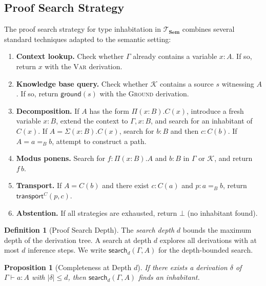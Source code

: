 \documentclass[11pt,a4paper]{article}
\theoremstyle{plain}
\newtheorem{proposition}[theorem]{Proposition}
\theoremstyle{definition}
\newtheorem{definition}[theorem]{Definition}
\theoremstyle{remark}
\newcommand{\Sem}{\mathbf{Sem}}
\newcommand{\transport}{\mathsf{transport}}
\begin{document}
\subsection{Proof Search Strategy}

The proof search strategy for type inhabitation in $\mathcal{T}_{\Sem}$ combines several standard techniques adapted to the semantic setting:

\begin{enumerate}[nosep]
  \item \textbf{Context lookup.} Check whether $\Gamma$ already contains a variable $x : A$.
  If so, return $x$ with the \textsc{Var} derivation.

  \item \textbf{Knowledge base query.} Check whether $\mathcal{K}$ contains a source $s$ witnessing $A$.
  If so, return $\mathsf{ground}(s)$ with the \textsc{Ground} derivation.

  \item \textbf{Decomposition.} If $A$ has the form $\Pi(x:B).C(x)$, introduce a fresh variable $x : B$, extend the context to $\Gamma, x : B$, and search for an inhabitant of $C(x)$.
  If $A = \Sigma(x:B).C(x)$, search for $b : B$ and then $c : C(b)$.
  If $A = a =_B b$, attempt to construct a path.

  \item \textbf{Modus ponens.} Search for $f : \Pi(x:B).A$ and $b : B$ in $\Gamma$ or $\mathcal{K}$, and return $f\,b$.

  \item \textbf{Transport.} If $A = C(b)$ and there exist $c : C(a)$ and $p : a =_B b$, return $\transport^C(p, c)$.

  \item \textbf{Abstention.} If all strategies are exhausted, return $\bot$ (no inhabitant found).
\end{enumerate}

\begin{definition}[Proof Search Depth]\label{def:depth}
The \emph{search depth} $d$ bounds the maximum depth of the derivation tree.
A search at depth $d$ explores all derivations with at most $d$ inference steps.
We write $\mathsf{search}_d(\Gamma, A)$ for the depth-bounded search.
\end{definition}

\begin{proposition}[Completeness at Depth $d$]\label{prop:completeness}
If there exists a derivation $\delta$ of $\Gamma \vdash a : A$ with $|\delta| \leq d$, then $\mathsf{search}_d(\Gamma, A)$ finds an inhabitant.
\end{proposition}
\end{document}
